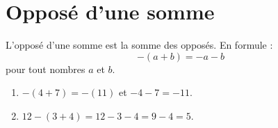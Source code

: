 


\section{Opposé d'une somme}

\begin{Aretenir}
    L'opposé d'une somme est la somme des opposés. En formule :
    \begin{equation}
        -(a+b)=-a-b
    \end{equation}
    pour tout nombres \( a\) et \( b\).
\end{Aretenir}

\begin{example}
    \begin{enumerate}
        \item
            \( -(4+7)=-(11)\) et \( -4-7=-11\).
        \item
            \( 12-(3+4)=12-3-4=9-4=5\).
    \end{enumerate}
\end{example}
